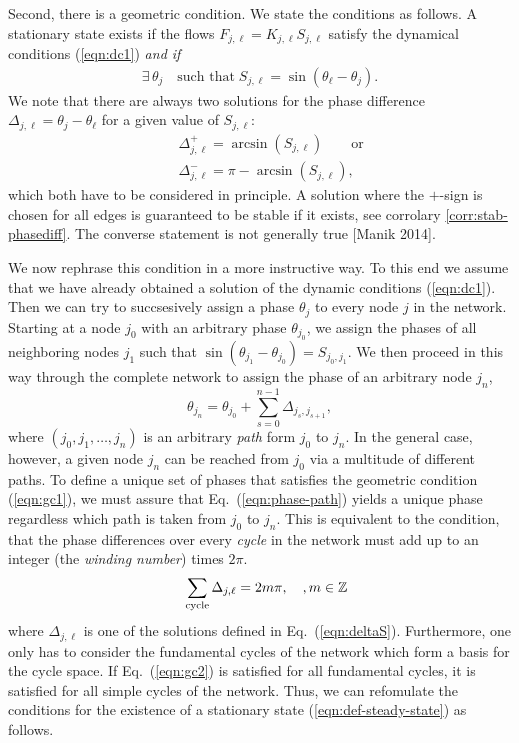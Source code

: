 \documentclass[10pt,aps,pra,onecolumn,superscriptaddress]{revtex4-1}
\newcommand{\be}{\begin{equation}}
\newcommand{\ee}{\end{equation}}
\newcommand{\bea}{\begin{eqnarray}}
\newcommand{\eea}{\end{eqnarray}}
\newcommand{\nn}{\nonumber}
\begin{document}
Second, there is a geometric condition.  We state the conditions as follows.
A stationary state exists if the flows 
$F_{j,\ell} = K_{j,\ell} S_{j,\ell}$
satisfy the dynamical conditions (\ref{eqn:dc1}) 
\emph{and if}  
\bea
    \exists \, \theta_j \quad \mbox{such that}  \;
    S_{j,\ell} = \sin(\theta_\ell - \theta_j).
  \label{eqn:gc1}
\eea
We note that there are always two solutions for the phase 
difference $\Delta_{j,\ell} = \theta_j - \theta_\ell$ 
for a given value of $S_{j,\ell}$:
\bea
     && \Delta_{j,\ell}^+ = \arcsin(S_{j,\ell}) 
      \qquad \mbox{or} \nn \\
    && \Delta_{j,\ell}^- = \pi -  \arcsin(S_{j,\ell}),
     \label{eqn:deltaS} 
\eea
which both have to be considered in principle. A solution
where the $+$-sign is chosen for all edges is guaranteed 
to be stable if it exists, see corrolary \ref{corr:stab-phasediff}.
The converse statement is not generally true
[Manik 2014].

We now rephrase this condition in a more instructive way.
To this end we assume that we have already obtained a solution
of the dynamic conditions (\ref{eqn:dc1}). Then we can try to
succsesively assign a phase $\theta_j$ to every node $j$ in the
network. Starting at a node $j_0$ with an arbitrary phase
$\theta_{j_0}$, we assign the phases of all neighboring nodes
$j_1$ such that $\sin(\theta_{j_1}   -   \theta_{j_0}) = S_{j_0,j_1}$.
We then proceed in this way through the complete network
to assign the phase of an arbitrary node $j_n$,
\be
   \theta_{j_n} = \theta_{j_0} + \sum_{s=0}^{n-1}
      \Delta_{j_s,j_{s+1}},
   \label{eqn:phase-path}
\ee
where $(j_0,j_1,\ldots,j_n)$ is an arbitrary \emph{path} form
$j_0$ to $j_n$. 
In the general case, however, a given node $j_n$ can be reached
from $j_0$ via a multitude of different paths. To define a unique
set of phases that satisfies the geometric condition (\ref{eqn:gc1}),
we must assure that Eq.~(\ref{eqn:phase-path}) yields a unique 
phase regardless which path is taken from $j_0$ to $j_n$.
This is equivalent to the condition, that the phase 
differences over every \emph{cycle} in the network 
must add up to an integer (the \emph{winding number}) times $2\pi$.  
\bea
       \label{eqn:gc2}
    && \sum_{\rm cycle} \Delta_{j,\ell} = 2 m \pi,\quad, m\in\mathbb{Z}
\eea
where $\Delta_{j,\ell}$ is one of the solutions defined in 
Eq.~(\ref{eqn:deltaS}). 
Furthermore, one only has to consider the fundamental
cycles of the network which form a basis for the cycle space.
If Eq.~(\ref{eqn:gc2}) is satisfied for all fundamental cycles, it is 
satisfied for all simple cycles of the network.
Thus, we can refomulate the conditions for the
existence of a stationary state (\ref{eqn:def-steady-state}) 
as follows.
\end{document}
